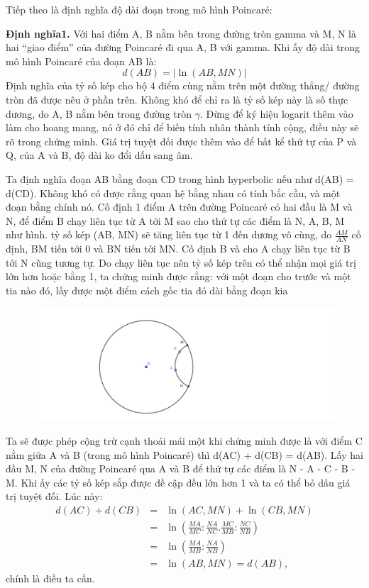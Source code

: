 Tiếp theo là định nghĩa độ dài đoạn trong mô hình Poincar\'e:

\textbf{Định nghĩa1.}  Với hai điểm A, B nằm bên trong đường tròn gamma và M, N là hai ``giao điểm” của đường Poincar\'e đi qua A, B với gamma. Khi ấy độ dài trong mô hình Poincar\'e của đoạn AB là:
\[ d(AB) = |\ln{(AB, MN)}| \]
Định nghĩa của tỷ số kép cho bộ 4 điểm cùng nằm trên một đường thẳng/ đường tròn đã được nêu ở phần trên. Không khó để chỉ ra là tỷ số kép này là số thực dương, do A, B nằm bên trong đường tròn $\gamma$. Đừng để ký hiệu logarit thêm vào làm cho hoang mang, nó ở đó chỉ để biến tính nhân thành tính cộng, điều này sẽ rõ trong chứng minh. Giá trị tuyệt đối được thêm vào để bất kể thứ tự của P và Q, của A và B, độ dài ko đổi dấu sang âm.

Ta định nghĩa đoạn AB bằng đoạn CD trong hình hyperbolic nếu như d(AB) = d(CD). Không khó có được rằng quan hệ bằng nhau có tính bắc cầu, và một đoạn bằng chính nó.
Cố định 1 điểm A trên đường Poincar\'e có hai đầu là M và N, để điểm B chạy liên tục từ A tới M sao cho thứ tự các điểm là N, A, B, M như hình. tỷ số kép (AB, MN) sẽ tăng liên tục từ 1 đến dương vô cùng, do $\frac{AM}{AN}$ cố định, BM tiến tới 0 và BN tiến tới MN. Cố định B và cho A chạy liên tục từ B tới N cũng tương tự. Do chạy liên tục nên tỷ số kép trên có thể nhận mọi giá trị lớn hơn hoặc bằng 1, ta chứng minh được rằng: với một đoạn cho trước và một tia nào đó, lấy được một điểm cách gốc tia đó dài bằng đoạn kia

\begin{figure}[ht]
\includegraphics[width=\textwidth]{Tiende_NTDQ_1.pdf}
\end{figure}

Ta sẽ được phép cộng trừ cạnh thoải mái một khi chứng minh được là với điểm C nằm giữa A và B (trong mô hình Poincar\'e) thì d(AC) + d(CB) = d(AB). Lấy hai đầu M, N của đường Poincar\'e qua A và B để thứ tự các điểm là N - A - C - B - M.
Khi ấy các tỷ số kép sắp được đề cập đều lớn hơn 1 và ta có thể bỏ dấu giá trị tuyệt đối. Lúc này:
\begin{eqnarray*}
d(AC) + d(CB)& =& \ln{(AC, MN)} + \ln{(CB, MN)}\\
& =& \ln{\left(\frac{MA}{MC} : \frac{NA}{NC} . \frac{MC}{MB} : \frac{NC}{NB} \right)}\\
& =& \ln{ \left(\frac{MA}{MB} : \frac{NA}{NB}\right)}\\
& =& \ln{(AB, MN)} = d(AB),\end{eqnarray*}
chính là điều ta cần.

